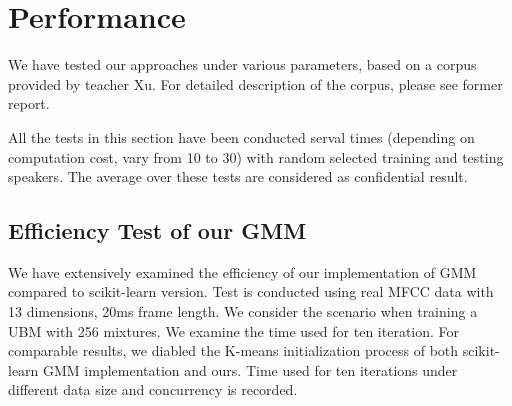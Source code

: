 \section{Performance}
\label{sec:result}
We have tested our approaches under various parameters, based on a corpus provided by teacher Xu.
For detailed description of the corpus, please see former report.

All the tests in this section have been conducted serval times
(depending on computation cost, vary from 10 to 30)
with random selected training and testing speakers.
The average over these tests are considered as confidential result.

\subsection{Efficiency Test of our GMM}
We have extensively examined the efficiency of our implementation of GMM
compared to scikit-learn version. Test is conducted using real MFCC data with
13 dimensions, 20ms frame length. We consider the scenario when training a UBM with 256 mixtures.
We examine the time used for ten iteration.  For comparable results, we diabled
the K-means initialization process of both scikit-learn GMM implementation and
ours. Time used for ten iterations under different data size and concurrency
is recorded.


